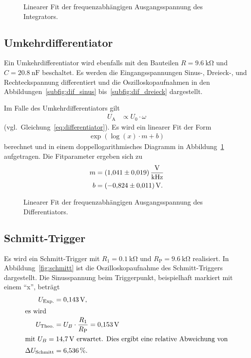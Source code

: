 \begin{figure}[ht]
  \centering
  
  \caption{Linearer Fit der frequenzabhängigen Ausgangsspannung des Integrators.}
  \label{fig:int}
\end{figure}

\subsection{Umkehrdifferentiator}
Ein Umkehrdifferentiator wird ebenfalls mit den Bauteilen $R = \SI{9.6}{\kilo\ohm}$ und $C = \SI{20.8}{\nano\farad}$ beschaltet.
Es werden die Eingangsspannungen Sinus-, Dreieck-, und Rechteckspannung differentiert und die Oszilloskopaufnahmen in den Abbildungen~\ref{subfig:dif_sinus} bis~\ref{subfig:dif_dreieck} dargestellt.

Im Falle des Umkehrdifferentiators gilt
\begin{align*}
  U_\text{A} &\propto {U_0} \cdot {\omega}
\end{align*}
(vgl.\ Gleichung~\eqref{eq:differentiator}).
Es wird ein linearer Fit der Form
\begin{align*}
  \exp{\left(\log{\left(x\right)} \cdot m + b\right)}
\end{align*}
berechnet und in einem doppellogarithmisches Diagramm in Abbildung~\ref{fig:int} aufgetragen.
Die Fitparameter ergeben sich zu
\begin{align*}
  m &= \SI{1.041 \pm 0.019}{\volt\per\kilo\hertz} \\
  b &= \SI{-0.824 \pm 0.011}{\volt} .
\end{align*}
\begin{figure}[ht]
  \centering
  
  \caption{Linearer Fit der frequenzabhängigen Ausgangsspannung des Differentiators.}
  \label{fig:dif}
\end{figure}

\subsection{Schmitt-Trigger}
Es wird ein Schmitt-Trigger mit $R_1 = \SI{0.1}{\kilo\ohm}$ und $R_\text{P} = \SI{9.6}{\kilo\ohm}$ realisiert.
In Abbildung~\ref{fig:schmitt} ist die Oszilloskopaufnahme des Schmitt-Triggers dargestellt.
Die Sinusspannung beim Triggerpunkt, beispielhaft markiert mit einem \enquote{x}, beträgt
\begin{align*}
  U_\text{Exp.} &= \SI{0.143}{\volt}, \\
  \intertext{es wird}
  U_\text{Theo.} &= U_B \cdot \frac{R_1}{R_\text{P}} = \SI{0.153}{\volt} \\
  \intertext{mit $U_B = \SI{14.7}{\volt}$ erwartet. Dies ergibt eine relative Abweichung von}
  \Delta U_\text{Schmitt} &= \SI{6.536}{\percent}.
\end{align*}

